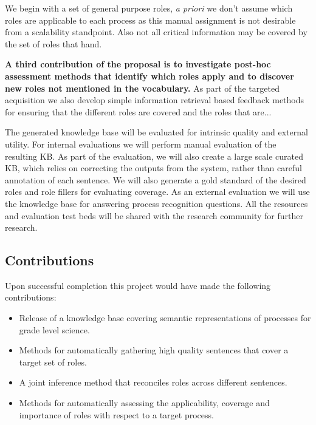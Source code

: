 We begin with a set of general purpose roles, {\em a priori} we don't assume which roles are applicable to each process as this manual assignment is not desirable from a scalability standpoint.
Also not all critical information may be covered by the set of roles that hand.

{\bf A third contribution of the proposal is to investigate post-hoc assessment methods that identify which roles apply and to discover new roles not mentioned in the vocabulary.}
As part of the targeted acquisition we also develop simple information retrieval based feedback methods for ensuring that the different roles are covered and the roles that are...

The generated knowledge base will be evaluated for intrinsic quality and external utility. For internal evaluations we will perform manual evaluation of the resulting KB. As part of the evaluation, we will also create a large scale curated KB, which relies on correcting the outputs from the system, rather than careful annotation of each sentence. We will also generate a gold standard of the desired roles and role fillers for evaluating coverage. As an external evaluation we will use the knowledge base for answering process recognition questions. All the resources and evaluation test beds will be shared with the research community for further research.
	

\subsection{Contributions}

Upon successful completion this project would have made the following contributions:
\begin{itemize}
\item Release of a knowledge base covering semantic representations of processes for grade level science.
\item Methods for automatically gathering high quality sentences that cover a target set of roles. 
\item A joint inference method that reconciles roles across different sentences.  
\item Methods for automatically assessing the applicability, coverage and importance of roles with respect to a target process.
\end{itemize}

 



